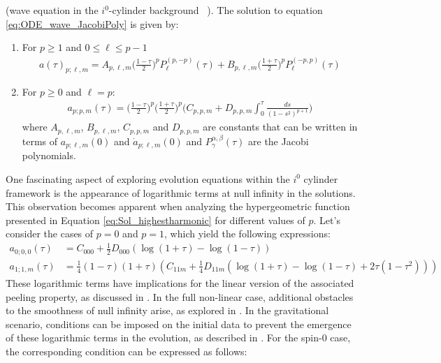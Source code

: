\begin{lemma} (wave equation in the $i^0$-cylinder
  background~ \cite{MinMacKro22})\label{Lemma:Sol_Jacobi_and_Logs}. The solution to equation \eqref{eq:ODE_wave_JacobiPoly} is given
  by:
	\begin{enumerate}
	\item For $p\geq 1$ and $0\leq \ell \leq p-1$
	 \begin{align}\label{eq:Sol_jac_poly}
    a(\tau)_{p;\ell,m} =A_{p,\ell,m}
		  \bigg(\frac{1-\tau}{2}\bigg)^{p}
                  P_{\ell}^{(p,-p)}(\tau) + B_{p,\ell,m}
                  \bigg(\frac{1+\tau}{2}\bigg)^{p}P_{\ell}^{(-p,p)}(\tau)
	 \end{align}
	
	\item For $p\geq 0$ and $\ell=p$:
     \begin{align}\label{eq:Sol_highestharmonic}
      {a}_{p;p,m}(\tau) =
      \bigg(\frac{1-\tau}{2}\bigg)^{p}\bigg(\frac{1+\tau}{2}\bigg)^{p}\Bigg(C_{p,p,m}
      +D_{p,p,m}\int_{0}^{\tau} \frac{ds}{(1-s^2)^{p+1}}\Bigg)
     \end{align}
	where $A_{p,\ell,m}$, $B_{p,\ell,m}$, $C_{p,p,m}$ and
        $D_{p,p,m}$ are constants that can be written in terms of
        $a_{p;\ell,m}(0)$ and $\dot{a}_{p;\ell,m}(0)$ and
        $P_{\gamma}^{\alpha, \beta}(\tau)$ are the Jacobi polynomials.
    \end{enumerate}
\end{lemma}
One fascinating aspect of exploring evolution equations within the $i^0$ cylinder framework is the appearance of logarithmic terms at null infinity in the solutions. This observation becomes apparent when analyzing the hypergeometric function presented in Equation \eqref{eq:Sol_highestharmonic} for different values of $p$. Let's consider the cases of $p = 0$ and $p = 1$, which yield the following expressions:
\begin{align}
  {a}_{0;0,0}(\tau) & = C_{000} + \tfrac{1}{2} D_{000} (\log(1 + \tau
  )- \log(1 - \tau ))\\ {a}_{1;1,m}(\tau) & = \tfrac{1}{4} (1 - \tau )
  (1 + \tau ) (C_{11m} + \tfrac{1}{4} D_{11m} ( \log(1 + \tau ) -
  \log(1 - \tau ) + 2\tau(1-\tau^2)))
\end{align}
These logarithmic terms have implications for the linear version of the associated peeling property, as discussed in \cite{Val07,MinMacKro22}. In the full non-linear case, additional obstacles to the smoothness of null infinity arise, as explored in \cite{Val04}. In the gravitational scenario, conditions can be imposed on the initial data to prevent the emergence of these logarithmic terms in the evolution, as described in \cite{Fri98a}. For the spin-0 case, the corresponding condition can be expressed as follows:
